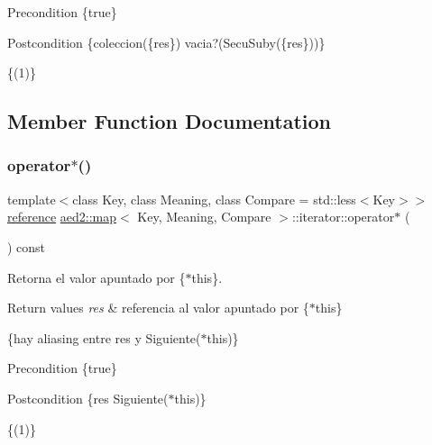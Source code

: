 \begin{DoxyPrecond}{Precondition}
\{true\} 
\end{DoxyPrecond}
\begin{DoxyPostcond}{Postcondition}
\{coleccion(\{res\})    vacia?(Secu\+Suby(\{res\}))\}
\end{DoxyPostcond}
\{(1)\} 

\subsection{Member Function Documentation}
\mbox{\label{classaed2_1_1map_1_1iterator_ab115711d0295146906830840590d900a}} 
\subsubsection{\texorpdfstring{operator$\ast$()}{operator*()}}
{\footnotesize\ttfamily template$<$class Key, class Meaning, class Compare = std\+::less$<$\+Key$>$$>$ \\
\hyperlink{classaed2_1_1map_1_1iterator_ac19788914a3110897e44c53f1318f6af}{reference} \hyperlink{classaed2_1_1map}{aed2\+::map}$<$ Key, Meaning, Compare $>$\+::iterator\+::operator$\ast$ (\begin{DoxyParamCaption}{ }\end{DoxyParamCaption}) const\hspace{0.3cm}{\ttfamily [inline]}}



Retorna el valor apuntado por \{$\ast$this\}. 


\begin{DoxyRetVals}{Return values}
{\em res} & referencia al valor apuntado por \{$\ast$this\}\\
\hline
\end{DoxyRetVals}
\{hay aliasing entre res y Siguiente($\ast$this)\}

\begin{DoxyPrecond}{Precondition}
\{true\} 
\end{DoxyPrecond}
\begin{DoxyPostcond}{Postcondition}
\{res  Siguiente($\ast$this)\}
\end{DoxyPostcond}
\{(1)\} \mbox{\label{classaed2_1_1map_1_1iterator_a7c44de7f0508186e135ddbcfe782fec5}} 
